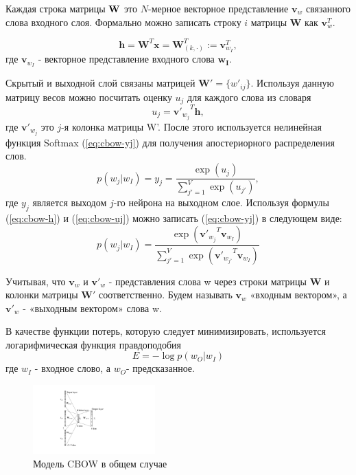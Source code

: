 Каждая строка матрицы ${\textbf W}$ это $N$-мерное векторное представление $\mathbf{v}_w$ связанного слова входного слоя. Формально можно записать строку $i$ матрицы $\textbf{W}$ как $\mathbf{v}_w^T$.
 
\begin{equation}
\mathbf{h} = \mathbf{W}^T \mathbf{x} = \mathbf{W}_{(k, \cdot)}^T := \mathbf{v}_{w_I}^T,
\label{eq:cbow-h}
\end{equation}
где $\mathbf{v}_{w_I}$ - векторное представление входного слова $\mathbf{w_I}$.

Скрытый и выходной слой связаны матрицей $\mathbf{W}' = \{w'_{ij}\}$. Используя данную матрицу весов можно посчитать оценку $u_j$ для каждого слова из словаря
\begin{equation}
u_j = {\mathbf{v}'_{w_j}}^T \mathbf{h},
\label{eq:cbow-uj}
\end{equation}
где  $\mathbf{v}'_{w_j}$ это $j$-я колонка матрицы W'. После этого используется нелинейная функция Softmax (\ref{eq:cbow-yj}) для получения апостериорного распределения слов.
\begin{equation}
p(w_j | w_I) = y_j = \frac{\exp(u_j)}{\sum_{j'=1}^V\exp(u_{j'})},
\label{eq:cbow-yj}
\end{equation}
где $y_j$ является выходом $j$-го нейрона на выходном слое.
Используя формулы (\ref{eq:cbow-h}) и (\ref{eq:cbow-uj}) можно записать (\ref{eq:cbow-yj}) в следующем виде:
\begin{equation}
p(w_j | w_I) = \frac{\exp\left({\mathbf{v}'_{w_j}}^T\mathbf{v}_{w_I}\right)}{\sum_{j'=1}^V\exp\left({\mathbf{v}'_{w_{j'}}}^T\mathbf{v}_{w_I}\right)}
\label{eq:cbow-pwo}
\end{equation}

Учитывая,  что $\mathbf{v}_w$ и $\mathbf{v}'_w$ - представления слова w через строки матрицы $\mathbf{W}$ и колонки матрицы $\mathbf{W'}$ соответственно. Будем называть $\mathbf{v}_w$  «входным вектором», а $\mathbf{v}'_w$ - «выходным вектором» слова w. 

В качестве функции потерь, которую следует минимизировать, используется логарифмическая функция правдоподобия
\begin{equation}
E=-\log p(w_O|w_I)
\label{eq:cbow-loss}
\end{equation}
где $w_I$ - входное слово, а $w_O$- предсказанное.

\begin{figure}[t]
\centering
\includegraphics[width=0.42\textwidth]{img/cbow-multi.pdf}
\caption{\label{fig:cbow-multi} Модель CBOW в общем случае}
\end{figure}

